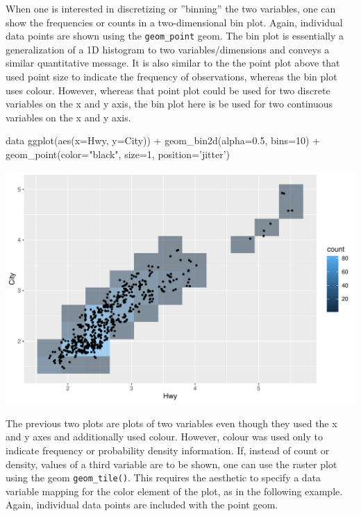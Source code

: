 When one is interested in discretizing or ''binning'' the two variables, one can show the frequencies or counts in a two-dimensional bin plot. Again, individual data points are shown using the \texttt{geom\_point} geom. The bin plot is essentially a generalization of a 1D histogram to two variables/dimensions and conveys a similar quantitative message. It is also similar to the the point plot above that used point size to indicate the frequency of observations, whereas the bin plot uses colour. However, whereas that point plot could be used for two discrete variables on the x and y axis, the bin plot here is be used for two continuous variables on the x and y axis.

\begin{Rcode}
data %
  ggplot(aes(x=Hwy, y=City)) + 
    geom_bin2d(alpha=0.5, bins=10) +
    geom_point(color="black", size=1, position='jitter')
\end{Rcode}

\begin{center}
  \includegraphics[width=.8\textwidth]{fuel.bin2d.pdf}
\end{center}



The previous two plots are plots of two variables even though they used the x and y axes and additionally used colour. However, colour was used only to indicate frequency or probability density information. If, instead of count or density, values of a third variable are to be shown, one can use the raster plot using the geom \texttt{geom\_tile()}. This requires the aesthetic to specify a data variable mapping for the color element of the plot, as in the following example. Again, individual data points are included with the point geom.

